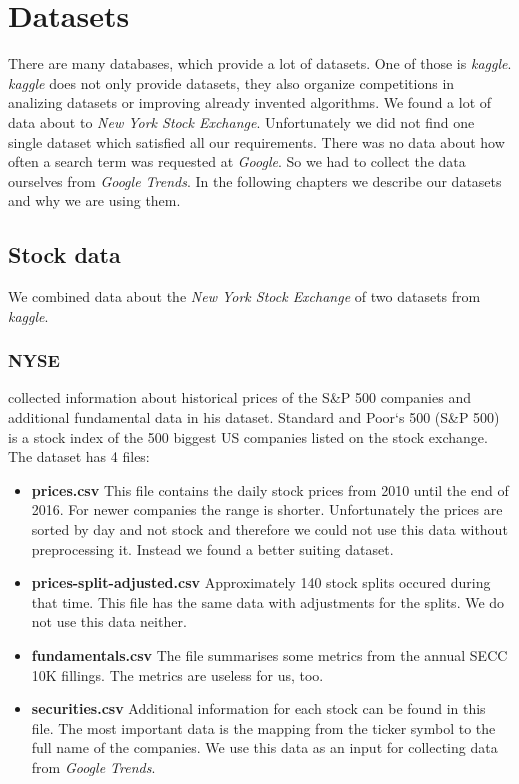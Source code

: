 \section{Datasets}
\label{sec:datasets}
There are many databases, which provide a lot of datasets. One of those is \textit{kaggle}. \textit{kaggle} does not only provide datasets, they also organize competitions in analizing datasets or improving already invented algorithms. We found a lot of data about to \textit{New York Stock Exchange}. Unfortunately we did not find one single dataset which satisfied all our requirements. There was no data about how often a search term was requested at \textit{Google}. So we had to collect the data ourselves from \textit{Google Trends}. In the following chapters we describe our datasets and why we are using them.

\subsection{Stock data}
We combined data about the \textit{New York Stock Exchange} of two datasets from \textit{kaggle}.
\label{subsec:stockdata}

\subsubsection{NYSE}
\label{subsub:nyse}
\cite{NYSE} collected information about historical prices of the S\&P 500 companies and additional fundamental data in his dataset. Standard and Poor`s 500 (S\&P 500) is a stock index of the 500 biggest US companies listed on the stock exchange.\\
The dataset has 4 files:
\begin{itemize}
	\item \textbf{prices.csv} This file contains the daily stock prices from 2010 until the end of 2016. For newer companies the range is shorter. Unfortunately the prices are sorted by day and not stock and therefore we could not use this data without preprocessing it. Instead we found a better suiting dataset.
	\item \textbf{prices-split-adjusted.csv} Approximately 140 stock splits occured during that time. This file has the same data with adjustments for the splits. We do not use this data neither.
	\item \textbf{fundamentals.csv} The file summarises some metrics from the annual SECC 10K fillings. The metrics are useless for us, too.
	\item \textbf{securities.csv} Additional information for each stock can be found in this file. The most important data is the mapping from the ticker symbol to the full name of the companies. We use this data as an input for collecting data from \textit{Google Trends}.
\end{itemize}

